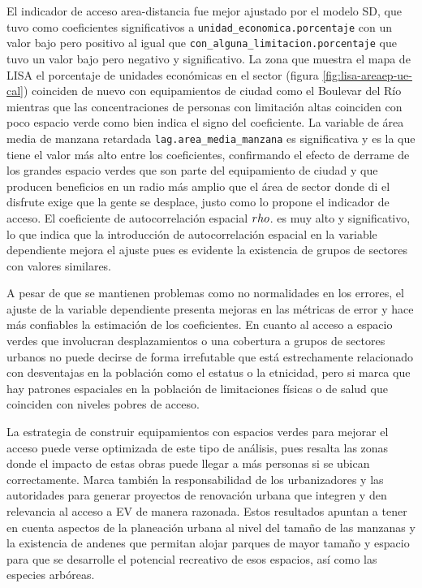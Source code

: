 \documentclass[12pt,]{book}
\begin{document}
El indicador de acceso area-distancia fue mejor ajustado por el modelo
SD, que tuvo como coeficientes significativos a
\texttt{unidad\_economica.porcentaje} con un valor bajo pero positivo al
igual que \texttt{con\_alguna\_limitacion.porcentaje} que tuvo un valor
bajo pero negativo y significativo. La zona que muestra el mapa de LISA
el porcentaje de unidades económicas en el sector (figura
\ref{fig:lisa-areaep-ue-cal}) coinciden de nuevo con equipamientos de
ciudad como el Boulevar del Río mientras que las concentraciones de
personas con limitación altas coinciden con poco espacio verde como bien
indica el signo del coeficiente. La variable de área media de manzana
retardada \texttt{lag.area\_media\_manzana} es significativa y es la que
tiene el valor más alto entre los coeficientes, confirmando el efecto de
derrame de los grandes espacio verdes que son parte del equipamiento de
ciudad y que producen beneficios en un radio más amplio que el área de
sector donde di el disfrute exige que la gente se desplace, justo como
lo propone el indicador de acceso. El coeficiente de autocorrelación
espacial \(\\rho\). es muy alto y significativo, lo que indica que la
introducción de autocorrelación espacial en la variable dependiente
mejora el ajuste pues es evidente la existencia de grupos de sectores
con valores similares.

A pesar de que se mantienen problemas como no normalidades en los
errores, el ajuste de la variable dependiente presenta mejoras en las
métricas de error y hace más confiables la estimación de los
coeficientes. En cuanto al acceso a espacio verdes que involucran
desplazamientos o una cobertura a grupos de sectores urbanos no puede
decirse de forma irrefutable que está estrechamente relacionado con
desventajas en la población como el estatus o la etnicidad, pero si
marca que hay patrones espaciales en la población de limitaciones
físicas o de salud que coinciden con niveles pobres de acceso.

La estrategia de construir equipamientos con espacios verdes para
mejorar el acceso puede verse optimizada de este tipo de análisis, pues
resalta las zonas donde el impacto de estas obras puede llegar a más
personas si se ubican correctamente. Marca también la responsabilidad de
los urbanizadores y las autoridades para generar proyectos de renovación
urbana que integren y den relevancia al acceso a EV de manera razonada.
Estos resultados apuntan a tener en cuenta aspectos de la planeación
urbana al nivel del tamaño de las manzanas y la existencia de andenes
que permitan alojar parques de mayor tamaño y espacio para que se
desarrolle el potencial recreativo de esos espacios, así como las
especies arbóreas.
\end{document}
